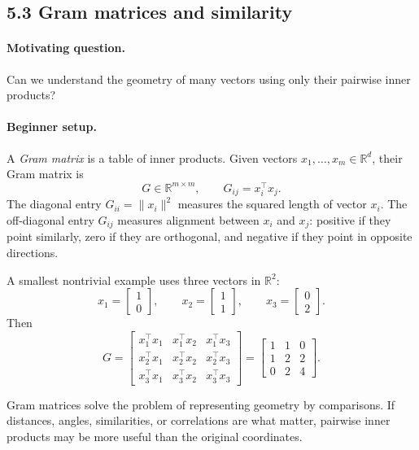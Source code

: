 \subsection{5.3 Gram matrices and similarity}

\paragraph{Motivating question.}
Can we understand the geometry of many vectors using only their pairwise inner products?

\paragraph{Beginner setup.}
A \emph{Gram matrix} is a table of inner products. Given vectors \(x_1,\dots,x_m\in\mathbb{R}^d\), their Gram matrix is
\[
G\in\mathbb{R}^{m\times m},
\qquad
G_{ij}=x_i^\top x_j.
\]
The diagonal entry \(G_{ii}=\|x_i\|^2\) measures the squared length of vector \(x_i\). The off-diagonal entry \(G_{ij}\) measures alignment between \(x_i\) and \(x_j\): positive if they point similarly, zero if they are orthogonal, and negative if they point in opposite directions.

A smallest nontrivial example uses three vectors in \(\mathbb{R}^2\):
\[
x_1=\begin{bmatrix}1\\0\end{bmatrix},
\qquad
x_2=\begin{bmatrix}1\\1\end{bmatrix},
\qquad
x_3=\begin{bmatrix}0\\2\end{bmatrix}.
\]
Then
\[
G=
\begin{bmatrix}
x_1^\top x_1 & x_1^\top x_2 & x_1^\top x_3\\
x_2^\top x_1 & x_2^\top x_2 & x_2^\top x_3\\
x_3^\top x_1 & x_3^\top x_2 & x_3^\top x_3
\end{bmatrix}
=
\begin{bmatrix}
1&1&0\\
1&2&2\\
0&2&4
\end{bmatrix}.
\]

Gram matrices solve the problem of representing geometry by comparisons. If distances, angles, similarities, or correlations are what matter, pairwise inner products may be more useful than the original coordinates.

